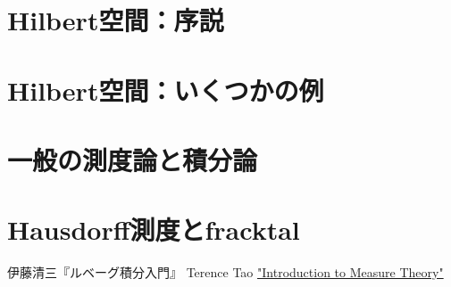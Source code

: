 \documentclass[uplatex, dvipdfmx]{jsreport}
\begin{document}
\chapter{Hilbert空間：序説}

\chapter{Hilbert空間：いくつかの例}

\chapter{一般の測度論と積分論}

\chapter{Hausdorff測度とfracktal}

\begin{thebibliography}{9}
    伊藤清三『ルベーグ積分入門』
    Terence Tao \href{https://terrytao.files.wordpress.com/2012/12/gsm-126-tao5-measure-book.pdf}{"Introduction to Measure Theory"}
\end{thebibliography}
\end{document}
